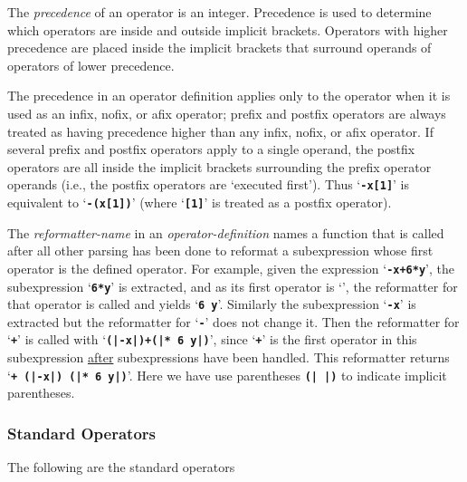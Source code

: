 \documentclass[12pt]{article}
\newcommand{\TT}[1]{{\tt \bfseries #1}}
\begin{document}
The {\em precedence} of an operator is an integer.  Precedence is used to
determine which operators are inside and outside implicit brackets.
Operators with higher precedence are placed inside the 
implicit brackets that surround operands of operators of lower precedence.

The precedence
in an operator definition applies only to the operator when it is used
as an infix, nofix, or afix operator; prefix and postfix operators are always
treated as having precedence higher than any infix, nofix, or afix operator.
If several prefix and postfix operators apply to a single operand,
the postfix operators are all inside the implicit brackets surrounding
the prefix operator operands (i.e., the postfix operators are
`executed first').  Thus `\TT{-x[1]}' is equivalent to `\TT{-(x[1])}'
(where `\TT{[1]}' is treated as a postfix operator).

The {\em reformatter-name} in an {\em operator-definition} names a
function that is called after all other parsing has been done to
reformat a subexpression whose first operator is the defined operator.
For example, given the expression `\TT{-x+6*y}', the subexpression
`\TT{6*y}' is extracted, and as its first operator is `\TT{*}',
the reformatter for that operator is called and yields `\TT{* 6 y}'.
Similarly the subexpression `\TT{-x}' is extracted but the reformatter
for `\TT{-}' does not change it.
Then the reformatter for `\TT{+}' is called
with `\TT{(|-x|)+(|* 6 y|)}', since `\TT{+}' is the first operator in
this subexpression \underline{after} subexpressions have been handled.
This reformatter returns `\TT{+ (|-x|) (|* 6 y|)}'.  Here we have
use parentheses \TT{(|~|)} to indicate implicit parentheses.


\subsubsection{Standard Operators}
\label{STANDARD-OPERATORS}

The following are the standard operators
\end{document}
